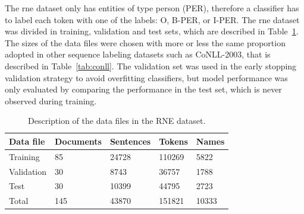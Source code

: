\documentclass{nle}
\begin{document}
The \gls{rne} dataset only has entities of type person (PER), therefore a classifier has to
label each token with one of the labels: O, B-PER, or I-PER. 
% 
% 
The \gls{rne} dataset was divided in training, validation and test sets, which are described in 
Table~\ref{tab:dataset}. The sizes of the data files were chosen with more or 
less the same proportion adopted in other sequence labeling datasets such
as {CoNLL-2003}, that is described in Table~\ref{tab:conll}. The validation set 
was used in the early stopping 
validation strategy to avoid overfitting classifiers, but model performance 
was only evaluated by comparing the performance in the test set, which is
never observed during training.

\begin{table}[h]
  \small
  \begin{center}
    \begin{tabular}{ lllll }
      \toprule
      Data file & Documents & Sentences & Tokens & Names \\
      \midrule
      Training    & 85  & 24728 & 110269 & 5822  \\  
      Validation  & 30  & 8743  & 36757  & 1788  \\
      Test        & 30  & 10399 & 44795  & 2723  \\
      \midrule
      Total       & 145 & 43870 & 151821 & 10333 \\
      \bottomrule
    \end{tabular}
  \end{center}
  \caption{Description of the data files in the RNE dataset.}
  \label{tab:dataset}
\end{table}
\end{document}
